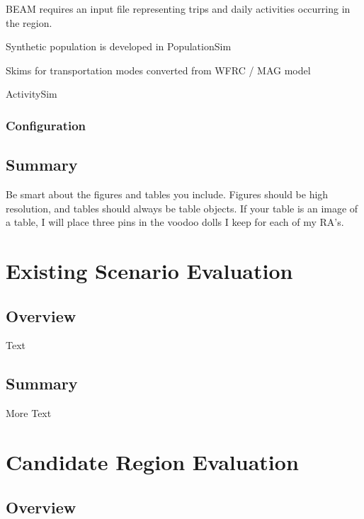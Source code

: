 \documentclass[
]{article}
\begin{document}
BEAM requires an input file representing trips and daily activities occurring in the region.

Synthetic population is developed in PopulationSim

Skims for transportation modes converted from WFRC / MAG model

ActivitySim

\hypertarget{configuration}{%
\subsubsection{Configuration}\label{configuration}}

\hypertarget{summary-1}{%
\subsection{Summary}\label{summary-1}}

Be smart about the figures and tables you include. Figures should be high resolution, and tables should always be table objects. If your table is an image of a table, I will place three pins in the voodoo dolls I keep for each of my RA's.

\hypertarget{existing-scenario-evaluation}{%
\section{Existing Scenario Evaluation}\label{existing-scenario-evaluation}}

\hypertarget{overview-2}{%
\subsection{Overview}\label{overview-2}}

Text

\hypertarget{summary-2}{%
\subsection{Summary}\label{summary-2}}

More Text

\hypertarget{candidate-region-evaluation}{%
\section{Candidate Region Evaluation}\label{candidate-region-evaluation}}

\hypertarget{overview-3}{%
\subsection{Overview}\label{overview-3}}
\end{document}
